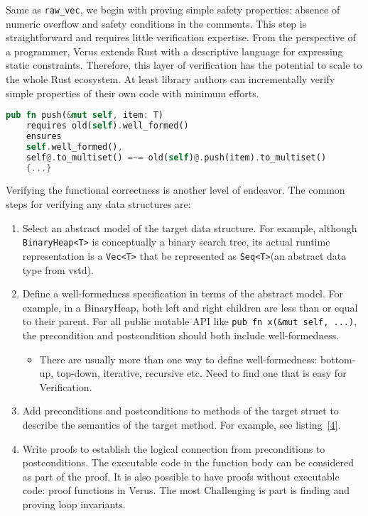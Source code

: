 \documentclass[conference]{IEEEtran}
\begin{document}
Same as \texttt{raw\_vec}, we begin with proving simple safety properties: absence of numeric overflow and safety conditions in the comments. This step is straightforward and requires little verification expertise. From the perspective of a programmer, Verus extends Rust with a descriptive language for expressing static constraints. Therefore, this layer of verification has the potential to scale to the whole Rust ecosystem. At least library authors can incrementally verify simple properties of their own code with minimum efforts.     

\begin{lstlisting}[float,language=Rust,style=colouredRust, caption={The specification of the \texttt{push} method of \texttt{BinaryHeap}.}, label = {4}]
    pub fn push(&mut self, item: T)
    requires old(self).well_formed()
    ensures 
    self.well_formed(),
    self@.to_multiset() =~= old(self)@.push(item).to_multiset()
    {...}
\end{lstlisting}
Verifying the functional correctness is another level of endeavor. The common steps for verifying any data structures are:
\begin{enumerate}
        \item Select an abstract model of the target data structure. For example, although \texttt{BinaryHeap<T>} is conceptually a binary search tree, its actual runtime representation is a \texttt{Vec<T>} that be represented as \texttt{Seq<T>}(an abstract data type from vstd).
   \item Define a well-formedness specification in terms of the abstract model. For example, in a BinaryHeap, both left and right children are less than or equal to their parent. For all public mutable API like \texttt{pub fn x(\&mut self, ...)}, the precondition and postcondition should both include well-formedness. 
   \begin{itemize}
        \item There are usually more than one way to define well-formedness: bottom-up, top-down, iterative, recursive etc. Need to find one that is easy for Verification.
   \end{itemize}
   \item Add preconditions and postconditions to methods of the target struct to describe the semantics of the target method. For example, see listing~\ref{4}.  
   \item Write proofs to establish the logical connection from preconditions to postconditions. The executable code in the function body can be considered as part of the proof. It is also possible to have proofs without executable code: proof functions in Verus. The most Challenging is part is finding and proving loop invariants.
\end{enumerate}
\end{document}
